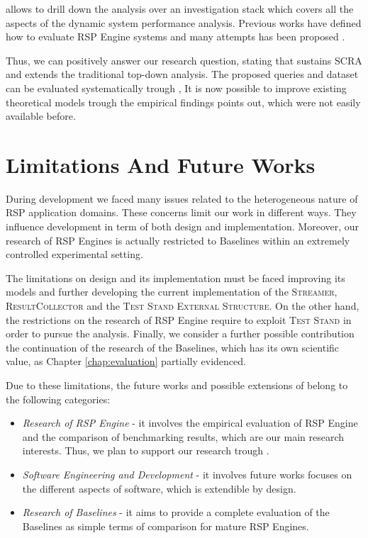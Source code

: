 \noindent \name allows to drill down the analysis over an investigation stack which covers all the aspects of the dynamic system performance analysis. Previous works have defined how to evaluate RSP Engine systems \cite{DBLP:conf/esws/ScharrenbachUMVB13} and many attempts has been proposed \cite{Zhang2012, LePhuoc2012c, DBLP:conf/semweb/DellAglioCBCV13}. 

Thus, we can positively answer our research question, stating that \name sustains SCRA and extends the traditional top-down analysis. The proposed queries and dataset can be evaluated systematically trough \namens, It is now possible to improve existing theoretical models trough the empirical findings \name points out, which were not easily available before.


\section{Limitations And Future Works}\label{sec:research-fw-conclusion}

During \name development we faced many issues related to the heterogeneous nature of RSP application domains. These concerns limit our work in different ways. They influence \name development in term of both design and implementation. Moreover, our research of RSP Engines  is actually restricted to \name Baselines within an extremely controlled experimental setting.

The limitations on \name design and its implementation must be faced improving its models and further developing the current implementation of the \textsc{Streamer}, \textsc{ResultCollector} and the \textsc{Test Stand External Structure}. On the other hand, the restrictions on the research of RSP Engine require to exploit \name \textsc{Test Stand} in order to pursue the analysis. Finally, we consider a further possible contribution the continuation of the research of the Baselines, which has its own scientific value, as Chapter \ref{chap:evaluation} partially evidenced.

Due to these limitations, the future works and possible extensions of \name belong to the following categories:
\begin{itemize}
\item \textit{Research of RSP Engine} - it involves the empirical evaluation of RSP Engine and the comparison of benchmarking results, which are our main research interests. Thus, we plan to support our research trough \namens.
\item \textit{Software Engineering and Development} - it involves future works focuses on the different aspects of \name software, which is extendible by design.
\item \textit{Research of Baselines} - it aims to provide a complete evaluation of the Baselines as simple terms of comparison for mature RSP Engines.
\end{itemize}


